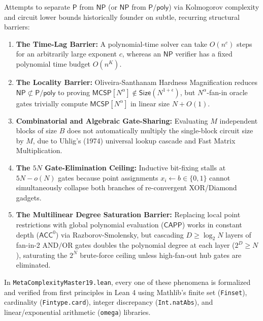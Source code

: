 \documentclass[11pt,a4paper]{article}
\theoremstyle{plain}
\theoremstyle{definition}
\theoremstyle{remark}
\newcommand{\lean}[1]{\texttt{\textcolor{slate}{#1}}}
\newcommand{\MCSP}{\mathsf{MCSP}}
\newcommand{\CAPP}{\mathsf{CAPP}}
\newcommand{\NP}{\mathsf{NP}}
\newcommand{\Ppoly}{\mathsf{P/poly}}
\newcommand{\ACC}{\mathsf{ACC}}
\newcommand{\Size}{\mathsf{Size}}
\begin{document}
Attempts to separate $\mathsf{P}$ from $\NP$ (or $\NP$ from $\Ppoly$) via Kolmogorov complexity and circuit lower bounds historically founder on subtle, recurring structural barriers:
\begin{enumerate}[noitemsep]
    \item \textbf{The Time-Lag Barrier:} A polynomial-time solver can take $O(n^c)$ steps for an arbitrarily large exponent $c$, whereas an $\NP$ verifier has a fixed polynomial time budget $O(n^K)$.
    \item \textbf{The Locality Barrier:} Oliveira-Santhanam Hardness Magnification reduces $\NP \not\subset \Ppoly$ to proving $\MCSP[N^\alpha] \notin \Size(N^{1+\epsilon})$, but $N^\alpha$-fan-in oracle gates trivially compute $\MCSP[N^\alpha]$ in linear size $N + O(1)$.
    \item \textbf{Combinatorial and Algebraic Gate-Sharing:} Evaluating $M$ independent blocks of size $B$ does not automatically multiply the single-block circuit size by $M$, due to Uhlig's (1974) universal lookup cascade and Fast Matrix Multiplication.
    \item \textbf{The $5N$ Gate-Elimination Ceiling:} Inductive bit-fixing stalls at $5N - o(N)$ gates because point assignments $x_i \leftarrow b \in \{0,1\}$ cannot simultaneously collapse both branches of re-convergent XOR/Diamond gadgets.
    \item \textbf{The Multilinear Degree Saturation Barrier:} Replacing local point restrictions with global polynomial evaluation ($\CAPP$) works in constant depth ($\ACC^0$) via Razborov-Smolensky, but cascading $D \ge \log_2 N$ layers of fan-in-2 $\text{AND}/\text{OR}$ gates doubles the polynomial degree at each layer ($2^D \ge N$), saturating the $2^N$ brute-force ceiling unless high-fan-out hub gates are eliminated.
\end{enumerate}

In \lean{MetaComplexityMaster19.lean}, every one of these phenomena is formalized and verified from first principles in Lean 4 using Mathlib's finite set (\lean{Finset}), cardinality (\lean{Fintype.card}), integer discrepancy (\lean{Int.natAbs}), and linear/exponential arithmetic (\lean{omega}) libraries.
\end{document}
